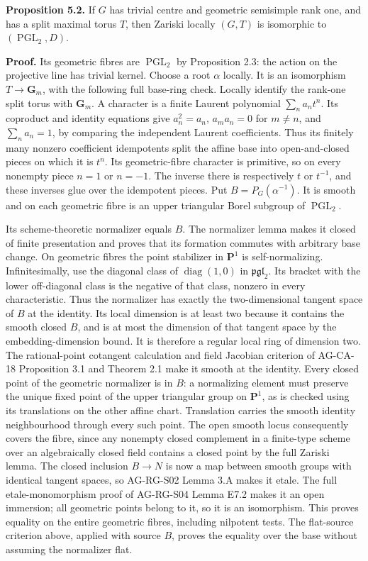 \documentclass[11pt,a4paper,openany]{report}
\newcounter{none}
\begin{document}
\textbf{Proposition 5.2.} If \(G\) has trivial centre and geometric semisimple rank one, and has a split maximal torus \(T\), then Zariski locally \((G,T)\) is isomorphic to \((\operatorname{PGL}_2,D)\).

\textbf{Proof.} Its geometric fibres are \(\operatorname{PGL}_2\) by Proposition 2.3: the action on the projective line has trivial kernel. Choose a root \(\alpha\) locally. It is an isomorphism \(T\to\mathbf G_m\), with the following full base-ring check. Locally identify the rank-one split torus with \(\mathbf G_m\). A character is a finite Laurent polynomial \(\sum_n a_nt^n\). Its coproduct and identity equations give \(a_n^2=a_n\), \(a_ma_n=0\) for \(m\ne n\), and \(\sum_n a_n=1\), by comparing the independent Laurent coefficients. Thus its finitely many nonzero coefficient idempotents split the affine base into open-and-closed pieces on which it is \(t^n\). Its geometric-fibre character is primitive, so on every nonempty piece \(n=1\) or \(n=-1\). The inverse there is respectively \(t\) or \(t^{-1}\), and these inverses glue over the idempotent pieces. Put \(B=P_G(\alpha^{-1})\). It is smooth and on each geometric fibre is an upper triangular Borel subgroup of \(\operatorname{PGL}_2\).

Its scheme-theoretic normalizer equals \(B\). The normalizer lemma makes it closed of finite presentation and proves that its formation commutes with arbitrary base change. On geometric fibres the point stabilizer in \(\mathbf P^1\) is self-normalizing. Infinitesimally, use the diagonal class of \(\operatorname{diag}(1,0)\) in \(\mathfrak{pgl}_2\). Its bracket with the lower off-diagonal class is the negative of that class, nonzero in every characteristic. Thus the normalizer has exactly the two-dimensional tangent space of \(B\) at the identity. Its local dimension is at least two because it contains the smooth closed \(B\), and is at most the dimension of that tangent space by the embedding-dimension bound. It is therefore a regular local ring of dimension two. The rational-point cotangent calculation and field Jacobian criterion of AG-CA-18 Proposition 3.1 and Theorem 2.1 make it smooth at the identity. Every closed point of the geometric normalizer is in \(B\): a normalizing element must preserve the unique fixed point of the upper triangular group on \(\mathbf P^1\), as is checked using its translations on the other affine chart. Translation carries the smooth identity neighbourhood through every such point. The open smooth locus consequently covers the fibre, since any nonempty closed complement in a finite-type scheme over an algebraically closed field contains a closed point by the full Zariski lemma. The closed inclusion \(B\to N\) is now a map between smooth groups with identical tangent spaces, so AG-RG-S02 Lemma 3.A makes it etale. The full etale-monomorphism proof of AG-RG-S04 Lemma E7.2 makes it an open immersion; all geometric points belong to it, so it is an isomorphism. This proves equality on the entire geometric fibres, including nilpotent tests. The flat-source criterion above, applied with source \(B\), proves the equality over the base without assuming the normalizer flat.
\end{document}
